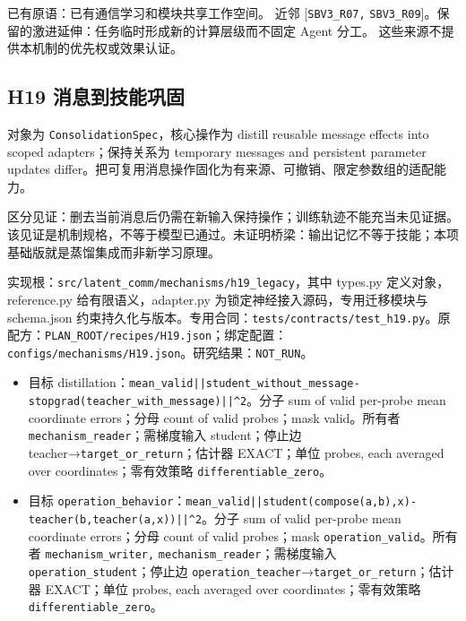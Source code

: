 \documentclass[
  10pt,
]{article}
\begin{document}
已有原语：已有通信学习和模块共享工作空间。 近邻 {[}\nolinkurl{SBV3_R07,}
\nolinkurl{SBV3_R09}{]}。保留的激进延伸：任务临时形成新的计算层级而不固定
Agent 分工。 这些来源不提供本机制的优先权或效果认证。

\subsection{H19
消息到技能巩固}\label{h19-ux6d88ux606fux5230ux6280ux80fdux5de9ux56fa}

对象为 \nolinkurl{ConsolidationSpec}，核心操作为 distill reusable
message effects into scoped adapters；保持关系为 temporary messages and
persistent parameter updates
differ。把可复用消息操作固化为有来源、可撤销、限定参数组的适配能力。

区分见证：删去当前消息后仍需在新输入保持操作；训练轨迹不能充当未见证据。
该见证是机制规格，不等于模型已通过。未证明桥梁：输出记忆不等于技能；本项基础版就是蒸馏集成而非新学习原理。

实现根：{\small\nolinkurl{src/latent_comm/mechanisms/h19_legacy}}，其中
types.py 定义对象，reference.py 给有限语义，adapter.py
为锁定神经接入源码，专用迁移模块与 schema.json
约束持久化与版本。专用合同：{\small\nolinkurl{tests/contracts/test_h19.py}}。原配方：{\small\nolinkurl{PLAN_ROOT/recipes/H19.json}}；绑定配置：{\small\nolinkurl{configs/mechanisms/H19.json}}。研究结果：\nolinkurl{NOT_RUN}。

\begin{itemize}
\item
  目标
  distillation：{\small\nolinkurl{mean_valid}\hspace{0.333em}\nolinkurl{||student_without_message}\hspace{0.333em}\nolinkurl{-}\hspace{0.333em}\nolinkurl{stopgrad(teacher_with_message)||^2}}。分子
  sum of valid per-probe mean coordinate errors；分母 count of valid
  probes；mask valid。所有者 \nolinkurl{mechanism_reader}；需梯度输入
  student；停止边 teacher→\nolinkurl{target_or_return}；估计器
  EXACT；单位 probes, each averaged over coordinates；零有效策略
  \nolinkurl{differentiable_zero}。
\item
  目标
  \nolinkurl{operation_behavior}：{\small\nolinkurl{mean_valid}\hspace{0.333em}\nolinkurl{||student(compose(a,b),x)-teacher(b,teacher(a,x))||^2}}。分子
  sum of valid per-probe mean coordinate errors；分母 count of valid
  probes；mask \nolinkurl{operation_valid}。所有者
  \nolinkurl{mechanism_writer,} \nolinkurl{mechanism_reader}；需梯度输入
  \nolinkurl{operation_student}；停止边
  \nolinkurl{operation_teacher}→\nolinkurl{target_or_return}；估计器
  EXACT；单位 probes, each averaged over coordinates；零有效策略
  \nolinkurl{differentiable_zero}。
\end{itemize}
\end{document}
